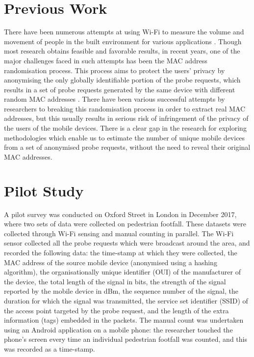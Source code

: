 \documentclass[11t, a4paper, twocolumn]{article}
\begin{document}
	\section{Previous Work}\label{prev}
		There have been numerous attempts at using Wi-Fi to measure the volume and movement of people in the built environment for various applications \citep{zarim2006,sap2015,reki2007}.
		Though most research obtains feasible and favorable results, in recent years, one of the major challenges faced in such attempts has been the MAC address randomisation process.
		This process aims to protect the users’ privacy by anonymising the only globally identifiable portion of the probe requests, which results in a set of probe requests generated by the same device with different random MAC addresses \citep{green2008}.
		There have been various successful attempts by researchers to breaking this randomisation process in order to extract real MAC addresses, \citep{martin2017} but this usually results in serious risk of infringement of the privacy of the users of the mobile devices.
		There is a clear gap in the research for exploring methodologies which enable us to estimate the number of unique mobile devices from a set of anonymised probe requests, without the need to reveal their original MAC addresses.

	\section{Pilot Study}\label{data}
		A pilot survey was conducted on Oxford Street in London in December 2017, where two sets of data were collected on pedestrian footfall.
		These datasets were collected through Wi-Fi sensing and manual counting in parallel.
		The Wi-Fi sensor collected all the probe requests which were broadcast around the area, and recorded the following data: the time-stamp at which they were collected, the MAC address of the source mobile device (anonymised using a hashing algorithm), the organisationally unique identifier (OUI) of the manufacturer of the device, the total length of the signal in bits, the strength of the signal reported by the mobile device in dBm, the sequence number of the signal, the duration for which the signal was transmitted, the service set identifier (SSID) of the access point targeted by the probe request, and the length of the extra information (tags) embedded in the packets.
		The manual count was undertaken using an Android application on a mobile phone: the researcher touched the phone’s screen every time an individual pedestrian footfall was counted, and this was recorded as a time-stamp. 
\end{document}
